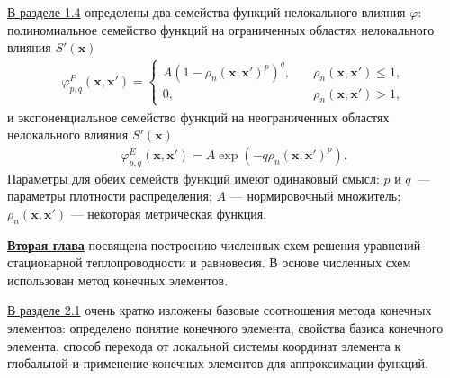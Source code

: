 \underline{В разделе 1.4} определены два семейства функций нелокального влияния $\varphi$: полиномиальное семейство функций на ограниченных областях нелокального влияния $S'(\boldsymbol{x})$
\begin{gather}
	\label{eq:Polynomial}
	\varphi_{p,q}^{P}(\boldsymbol{x}, \boldsymbol{x}') =
	\begin{cases}
		A(1 - \rho_n(\boldsymbol{x}, \boldsymbol{x}')^p)^q, \quad &\rho_n(\boldsymbol{x}, \boldsymbol{x}') \leqslant 1, \\
		0, &\rho_n(\boldsymbol{x}, \boldsymbol{x}') > 1,
	\end{cases}
\end{gather}
и экспоненциальное семейство функций на неограниченных областях нелокального влияния $S'(\boldsymbol{x})$
\begin{gather}
	\label{eq:Exponential}
	\varphi_{p,q}^{E} (\boldsymbol{x}, \boldsymbol{x}') =
	A \exp \left(-q\rho_n(\boldsymbol{x}, \boldsymbol{x}')^p \right).
\end{gather}
Параметры для обеих семейств функций имеют одинаковый смысл: $p$ и $q$~--- параметры плотности распределения; $A$ --- нормировочный множитель; $\rho_n(\boldsymbol{x}, \boldsymbol{x}')$ --- некоторая метрическая функция.

\underline{\textbf{Вторая глава}} посвящена построению численных схем решения уравнений стационарной теплопроводности и равновесия. В основе численных схем использован метод конечных элементов.

\underline{В разделе 2.1} очень кратко изложены базовые соотношения метода конечных элементов: определено понятие конечного элемента, свойства базиса конечного элемента, способ перехода от локальной системы координат элемента к глобальной и применение конечных элементов для аппроксимации функций.

